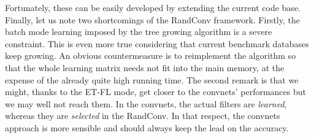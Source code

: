 \documentclass[a4paper]{report}
\begin{document}
\par
Fortunately, these can be easily developed by extending the current code base. Finally, let us note two shortcomings of the RandConv framework. Firstly, the batch mode learning imposed by the tree growing algorithm is a severe constraint. This is even more true considering that current benchmark databases keep growing. An obvious countermeasure is to reimplement the algorithm so that the whole learning matrix needs not fit into the main memory, at the expense of the already quite high running time. The second remark is that we might, thanks to the ET-FL mode, get closer to the convnets' performances but we may well not reach them. In the convnets, the actual filters are \textit{learned}, whereas they are \textit{selected} in the RandConv. In that respect, the convnets approach is more sensible and should always keep the lead on the accuracy.




 


  
\end{document}
